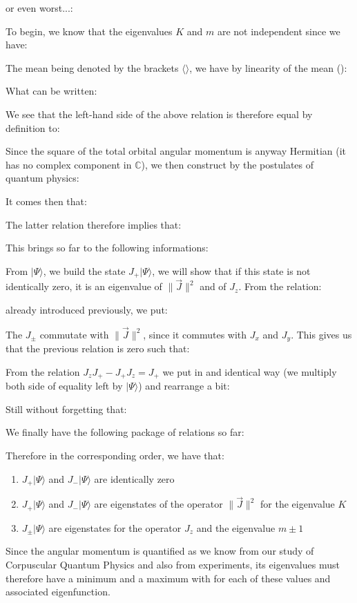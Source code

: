	or even worst...:
	
	To begin, we know that the eigenvalues $K$ and $m$ are not independent since we have:
	
	The mean being denoted by the brackets $\langle \rangle$, we have by linearity of the mean ():
	
	What can be written:
	
	We see that the left-hand side of the above relation is therefore equal by definition to:
	
	Since the square of the total orbital angular momentum is anyway Hermitian (it has no complex component in $\mathbb{C}$), we then construct by the postulates of quantum physics:
	
	It comes then that:
	
	The latter relation therefore implies that:
	
	This brings so far to the following informations:
	
	From $|\Psi\rangle$, we build the state $J_+|\Psi\rangle$, we will show that if this state is not identically zero, it is an eigenvalue of $\|\vec{J}\|^2$ and of $J_z$. From the relation:
	
	already introduced previously, we put:
	
	The $J_{\pm}$ commutate with $\|\vec{J}\|^2$, since it commutes with $J_x$ and $J_y$. This gives us that the previous relation is zero such that:
	
	From the relation $J_zJ_+-J_+J_z=J_+$ we put in and identical way (we multiply both side of equality left by $|\Psi\rangle$) and rearrange a bit:
	
	Still without forgetting that:
	
	We finally have the following package of relations so far:
	
	Therefore in the corresponding order, we have that:
	\begin{enumerate}
		\item $J_+|\Psi\rangle$ and $J_-|\Psi\rangle$ are identically zero
		\item $J_+|\Psi\rangle$ and $J_-|\Psi\rangle$ are eigenstates of the operator $\|\vec{J}\|^2$ for the eigenvalue $K$
		
		\item $J_\pm|\Psi\rangle$ are eigenstates for the operator $J_z$ and the eigenvalue $m\pm 1$
	\end{enumerate} 
	Since the angular momentum is quantified as we know from our study of Corpuscular Quantum Physics and also from experiments, its eigenvalues must therefore have a minimum and a maximum with for each of these values and associated eigenfunction.
	
